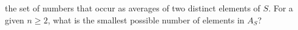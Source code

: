 the set of numbers that occur as averages of two distinct elements of
$S$. For a given $n \geq 2$, what is the smallest possible number of
elements in $A_S$?

